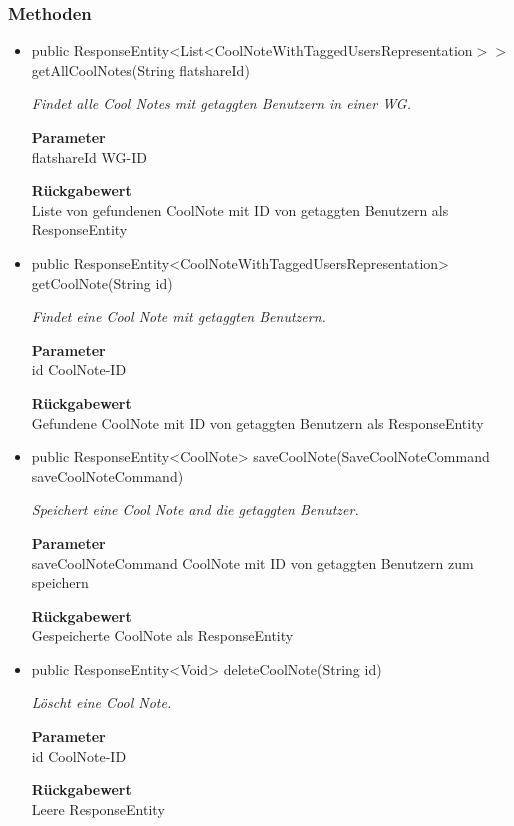 \documentclass[a4paper]{scrreprt}
\begin{document}
        \subsubsection{Methoden}
        \begin{itemize}
        	\item{public ResponseEntity<List<CoolNoteWithTaggedUsersRepresentation$>>$ getAllCoolNotes(String flatshareId)}
        	
        	\textit{Findet alle Cool Notes mit getaggten Benutzern in einer WG.}
        	
        	\textbf{Parameter} \\
        	flatshareId WG-ID
        	
        	\textbf{Rückgabewert} \\
        	Liste von gefundenen CoolNote mit ID von getaggten Benutzern als ResponseEntity        \item{public ResponseEntity<CoolNoteWithTaggedUsersRepresentation> getCoolNote(String id)}
        	
        	\textit{Findet eine Cool Note mit getaggten Benutzern.}
        	
        	\textbf{Parameter} \\
        	id CoolNote-ID
        	
        	\textbf{Rückgabewert} \\
        	Gefundene CoolNote mit ID von getaggten Benutzern als ResponseEntity        \item{public ResponseEntity<CoolNote> saveCoolNote(SaveCoolNoteCommand saveCoolNoteCommand)}
        	
        	\textit{Speichert eine Cool Note and die getaggten Benutzer.}
        	
        	\textbf{Parameter} \\
        	saveCoolNoteCommand CoolNote mit ID von getaggten Benutzern zum speichern
        	
        	\textbf{Rückgabewert} \\
        	Gespeicherte CoolNote als ResponseEntity        \item{public ResponseEntity<Void> deleteCoolNote(String id)}
        	
        	\textit{Löscht eine Cool Note.}
        	
        	\textbf{Parameter} \\
        	id CoolNote-ID
        	
        	\textbf{Rückgabewert} \\
        	Leere ResponseEntity
        \end{itemize}
\end{document}
